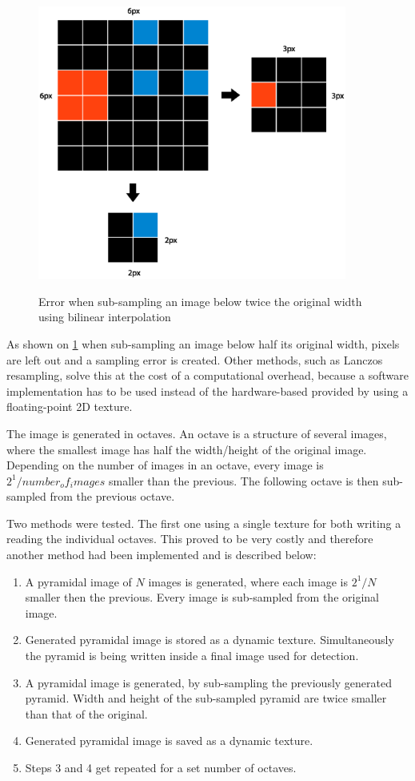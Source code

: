 \begin{center}
\begin{figure}[h]
	\centering\includegraphics[height=9cm]{fig/bilinear_error.eps}\label{fig:bilinear-error}
	\caption{Error when sub-sampling an image below twice the original width using bilinear interpolation}
\end{figure}
\end{center}

As shown on \ref{fig:bilinear-error} when sub-sampling an image below half its original width, pixels are left out and a sampling error is created. Other methods, such as Lanczos resampling, solve this at the cost of a computational overhead, because a software implementation has to be used instead of the hardware-based provided by using a floating-point 2D texture.

The image is generated in octaves. An octave is a structure of several images, where the smallest image has half the width/height of the original image. Depending on the number of images in an octave, every image is $2^1/number_of_images$ smaller than the previous. The following octave is then sub-sampled from the previous octave.

Two methods were tested. The first one using a single texture for both writing a reading the individual octaves. This proved to be very costly and therefore another method had been implemented and is described below:

\begin{enumerate}
	\item A pyramidal image of $N$ images is generated, where each image is $2^1/N$ smaller then the previous. Every image is sub-sampled from the original image.
	\item Generated pyramidal image is stored as a dynamic texture. Simultaneously the pyramid is being written inside a final image used for detection.
	\item A pyramidal image is generated, by sub-sampling the previously generated pyramid. Width and height of the sub-sampled pyramid are twice smaller than that of the original.
	\item Generated pyramidal image is saved as a dynamic texture.
	\item Steps 3 and 4 get repeated for a set number of octaves.
\end{enumerate}

